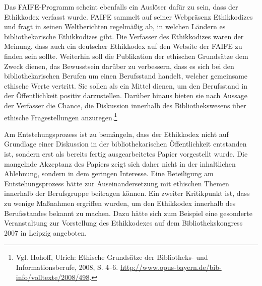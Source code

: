 \documentclass[output=paper]{langscibook}
\begin{document}
Das FAIFE-Programm scheint ebenfalls ein Auslöser dafür zu sein, dass
der Ethikkodex verfasst wurde. FAIFE sammelt auf seiner Webpräsenz
Ethikkodizes und fragt in seinen Weltberichten regelmäßig ab, in welchen
Ländern es bibliothekarische Ethikkodizes gibt. Die Verfasser des
Ethikkodizes waren der Meinung, dass auch ein deutscher Ethikkodex auf
den Website der FAIFE zu finden sein sollte. Weiterhin soll die
Publikation der ethischen Grundsätze dem Zweck dienen, das Bewusstsein
darüber zu verbessern, dass es sich bei den bibliothekarischen Berufen
um einen Berufsstand handelt, welcher gemeinsame ethische Werte
vertritt. Sie sollen als ein Mittel dienen, um den Berufsstand in der
Öffentlichkeit positiv darzustellen. Darüber hinaus bieten sie nach
Aussage der Verfasser die Chance, die Diskussion innerhalb des
Bibliothekswesens über ethische Fragestellungen anzuregen.\footnote{Vgl.
  Hohoff, Ulrich: Ethische Grundsätze der Bibliotheks- und
  Informationsberufe, 2008, S. 4--6.
  \url{http://www.opus-bayern.de/bib-info/volltexte/2008/498}.}

Am Entstehungsprozess ist zu bemängeln, dass der Ethikkodex nicht auf
Grundlage einer Diskussion in der bibliothekarischen Öffentlichkeit
entstanden ist, sondern erst als bereits fertig ausgearbeitetes Papier
vorgestellt wurde. Die mangelnde Akzeptanz des Papiers zeigt sich daher
nicht in der inhaltlichen Ablehnung, sondern in dem geringen Interesse.
Eine Beteiligung am Entstehungsprozess hätte zur Auseinandersetzung mit
ethischen Themen innerhalb der Berufsgruppe beitragen können. Ein
zweiter Kritikpunkt ist, dass zu wenige Maßnahmen ergriffen wurden, um
den Ethikkodex innerhalb des Berufsstandes bekannt zu machen. Dazu hätte
sich zum Beispiel eine gesonderte Veranstaltung zur Vorstellung des
Ethikkodexes auf dem Bibliothekskongress 2007 in Leipzig angeboten.
\end{document}
